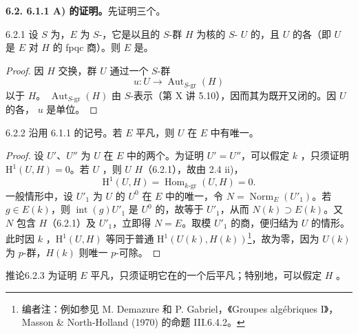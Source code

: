 \textbf{6.2. 6.1.1 A) 的证明。}先证明三个。
\begin{SGAresult}{}{6.2.1}
设 $S$ 为，$E$ 为 $S$-，它是以且的 $S$-群 $H$ 为核的 $S$- $U$ 的，且 $U$ 的各（即 $U$ 是 $E$ 对 $H$ 的 fpqc 商）。则 $E$ 是。
\end{SGAresult}
\begin{proof}
因 $H$ 交换，群 $U$ 通过一个 $S$-群
\[u:U\longrightarrow\operatorname{Aut}_{S\text{-gr}}(H)\]
以于 $H$。 $\operatorname{Aut}_{S\text{-gr}}(H)$ 由 $S$-表示（第 X 讲 5.10），因而其为既开又闭的。因 $U$ 的各， $u$ 是单位。
\end{proof}
\begin{SGAresult}{}{6.2.2}
沿用 6.1.1 的记号。若 $E$ 平凡，则 $U$ 在 $E$ 中有唯一。
\end{SGAresult}
\begin{proof}
设 $U'$、$U''$ 为 $U$ 在 $E$ 中的两个。为证明 $U'=U''$，可以假定 $k$ ，只须证明 $\mathrm H^1(U,H)=0$。若 $U$ ，则 $U$  $H$（6.2.1），故由 2.4 ii)，
\[\mathrm H^1(U,H)=\operatorname{Hom}_{k\text{-gr}}(U,H)=0.\]
一般情形中，设 $U'_1$ 为 $U$ 的 $U^0$ 在 $E$ 中的唯一，令 $N=\operatorname{Norm}_E(U'_1)$。若 $g\in E(k)$，则 $\operatorname{int}(g)U'_1$ 是 $U^0$ 的，故等于 $U'_1$，从而 $N(k)\supset E(k)$。又 $N$ 包含 $H$（6.2.1）及 $U'_1$，立即得 $N=E$。取模 $U'_1$ 的商，便归结为 $U$ 的情形。此时因 $k$ ，$\mathrm H^1(U,H)$
等同于普通 $\mathrm H^1(U(k),H(k))$\footnote{编者注：例如参见 M. Demazure 和 P. Gabriel，《Groupes algébriques I》，Masson \& North-Holland (1970) 的命题 III.6.4.2。}，故为零，因为 $U(k)$ 为 $p$-群，$H(k)$ 则唯一 $p$-可除。
\end{proof}
\begin{SGAresult}{推论}{6.2.3}
为证明 $E$ 平凡，只须证明它在的一个后平凡；特别地，可以假定 $H$ 。
\end{SGAresult}
